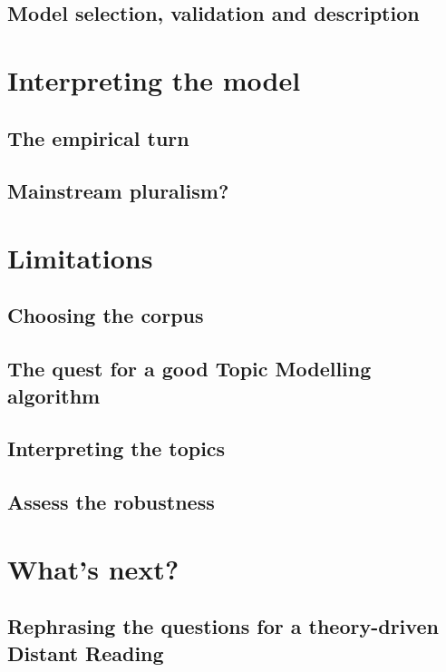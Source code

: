 \documentclass[a4paper, headings=standardclasses]{scrartcl}
\begin{document}
\subsection{Model selection, validation and description}

\section{Interpreting the model}

\subsection{The empirical turn}

\subsection{Mainstream pluralism?}

\section{Limitations}
\subsection{Choosing the corpus}

\subsection{The quest for a good Topic Modelling algorithm}

\subsection{Interpreting the topics}

\subsection{Assess the robustness}

\section{What's next?}
\subsection{Rephrasing the questions for a theory-driven Distant Reading}
\end{document}

